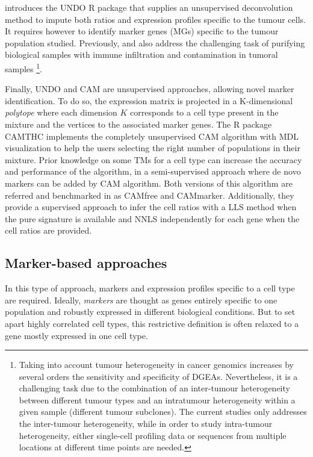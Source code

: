 \autocite{wang_etal15} introduces
the UNDO R package that supplies an unsupervised deconvolution method to
impute both ratios and expression profiles specific to the tumour cells.
It requires however to identify marker genes (MGs) specific to the
tumour population studied. Previously,
\autocite{ahn_etal13} and
\autocite{quon_etal13} also address the
challenging task of purifying biological samples with immune infiltration and contamination in tumoral samples \footnote{Taking into account tumour heterogeneity in cancer genomics increases by several orders the sensitivity and specificity of DGEAs. Nevertheless, it is a challenging task due to the combination of an inter-tumour heterogeneity between different tumour types and an intratumour heterogeneity within a given sample (different tumour subclones). The current studies only addresses the inter-tumour heterogeneity, while in order to study intra-tumour
heterogeneity, either single-cell profiling data or sequences from multiple locations at different time points are needed.}.

Finally, UNDO \autocite{wang_etal15}
and CAM \autocite{wang_etal16} are
unsupervised approaches, allowing novel marker identification. To do so,
the expression matrix is projected in a K-dimensional \emph{polytope}
where each dimension \(K\) corresponds to a cell type present in the
mixture and the vertices to the associated marker genes. The R package
CAMTHC \autocite{chen19} implements the
completely unsupervised CAM algorithm with MDL visualization to help the
users selecting the right number of populations in their mixture. Prior
knowledge on some TMs for a cell type can increase the accuracy and
performance of the algorithm, in a semi-supervised approach where de
novo markers can be added by CAM algorithm. Both versions of this
algorithm are referred and benchmarked in
\autocite{jin_liu21} as CAMfree and
CAMmarker. Additionally, they provide a supervised approach to infer the
cell ratios with a LLS method when the pure signature is available and
NNLS independently for each gene when the cell ratios are provided.


\subsection{Marker-based approaches}
\label{subsec:marker-based-approaches}

In this type of approach, markers and expression profiles specific to a
cell type are required. Ideally, \emph{markers} are thought as genes
entirely specific to one population and robustly expressed in different
biological conditions. But to set apart highly correlated cell types,
this restrictive definition is often relaxed to a gene mostly expressed
in one cell type.

